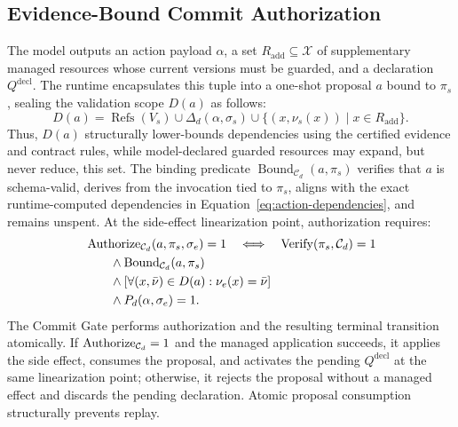 \subsection{Evidence-Bound Commit Authorization}
\label{sec:evidence-bound-actions}
The model outputs an action payload $\alpha$, a set $R_{\mathrm{add}}\subseteq\mathcal X$ of supplementary managed resources whose current versions must be guarded, and a declaration $Q^{\mathrm{decl}}$. The runtime encapsulates this tuple into a one-shot proposal $a$ bound to $\pi_s$, sealing the validation scope $D(a)$ as follows:
\begin{equation}
D(a)=\operatorname{Refs}(V_s)
 \cup\Delta_d(\alpha,\sigma_s)
 \cup\{(x,\nu_s(x))\mid x\in R_{\mathrm{add}}\}.
\label{eq:action-dependencies}
\end{equation}
Thus, $D(a)$ structurally lower-bounds dependencies using the certified evidence and contract rules, while model-declared guarded resources may expand, but never reduce, this set.
The binding predicate $\operatorname{Bound}_{\mathcal C_d}(a,\pi_s)$ verifies that $a$ is schema-valid, derives from the invocation tied to $\pi_s$, aligns with the exact runtime-computed dependencies in Equation~\eqref{eq:action-dependencies}, and remains unspent. At the side-effect linearization point, authorization requires:
\begin{equation}
\begin{aligned}
&\operatorname{Authorize}_{\mathcal C_d}(a,\pi_s,\sigma_e)=1
\quad\Longleftrightarrow\quad
\operatorname{Verify}(\pi_s,\mathcal C_d)=1\\
&\qquad{}\land
\operatorname{Bound}_{\mathcal C_d}(a,\pi_s)\\
&\qquad{}\land
\left[\forall(x,\bar\nu)\in D(a):\nu_e(x)=\bar\nu\right]\\
&\qquad{}\land P_d(\alpha,\sigma_e)=1 .
\end{aligned}
\label{eq:commit-authorization}
\end{equation}
The Commit Gate performs authorization and the resulting terminal transition atomically. If $\operatorname{Authorize}_{\mathcal C_d}=1$ and the managed application succeeds, it applies the side effect, consumes the proposal, and activates the pending $Q^{\mathrm{decl}}$ at the same linearization point; otherwise, it rejects the proposal without a managed effect and discards the pending declaration. Atomic proposal consumption structurally prevents replay.
